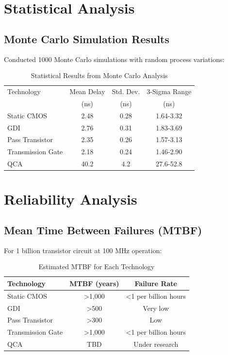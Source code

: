 \documentclass[12pt,a4paper,twoside]{report}
\begin{document}
\begin{appendices}
\section{Statistical Analysis}

\subsection{Monte Carlo Simulation Results}

Conducted 1000 Monte Carlo simulations with random process variations:

\begin{table}[H]
\centering
\caption{Statistical Results from Monte Carlo Analysis}
\label{tab:monte_carlo}
\begin{tabularx}{\textwidth}{lccc}
\toprule
Technology & Mean Delay & Std. Dev. & 3-Sigma Range \\
 & (ns) & (ns) & (ns) \\
\midrule
Static CMOS & 2.48 & 0.28 & 1.64-3.32 \\
GDI & 2.76 & 0.31 & 1.83-3.69 \\
Pass Transistor & 2.35 & 0.26 & 1.57-3.13 \\
Transmission Gate & 2.18 & 0.24 & 1.46-2.90 \\
QCA & 40.2 & 4.2 & 27.6-52.8 \\
\bottomrule
\end{tabularx}
\end{table}

\section{Reliability Analysis}

\subsection{Mean Time Between Failures (MTBF)}

For 1 billion transistor circuit at 100 MHz operation:

\begin{table}[H]
\centering
\caption{Estimated MTBF for Each Technology}
\label{tab:mtbf}
\begin{tabularx}{\textwidth}{lcc}
\toprule
Technology & MTBF (years) & Failure Rate \\
\midrule
Static CMOS & >1,000 & <1 per billion hours \\
GDI & >500 & Very low \\
Pass Transistor & >300 & Low \\
Transmission Gate & >1,000 & <1 per billion hours \\
QCA & TBD & Under research \\
\bottomrule
\end{tabularx}
\end{table}


\end{appendices}
\end{document}
